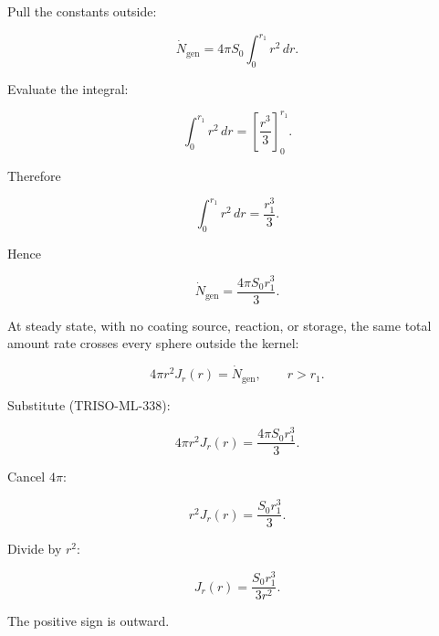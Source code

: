 \documentclass[11pt,a4paper]{article}
\begin{document}
Pull the constants outside:

\begin{equation}
\dot N_{\mathrm{gen}}
=
4\pi S_0
\int_0^{r_1}r^2\,dr.
\tag{TRISO-ML-335}
\label{eq:triso-ml-335}
\end{equation}

Evaluate the integral:

\begin{equation}
\int_0^{r_1}r^2\,dr
=
\left[\frac{r^3}{3}\right]_0^{r_1}.
\tag{TRISO-ML-336}
\label{eq:triso-ml-336}
\end{equation}

Therefore

\begin{equation}
\int_0^{r_1}r^2\,dr
=
\frac{r_1^3}{3}.
\tag{TRISO-ML-337}
\label{eq:triso-ml-337}
\end{equation}

Hence

\begin{equation}
\boxed{
\dot N_{\mathrm{gen}}
=
\frac{4\pi S_0r_1^3}{3}.
}
\tag{TRISO-ML-338}
\label{eq:triso-ml-338}
\end{equation}

At steady state, with no coating source, reaction, or storage, the same total amount rate crosses every sphere outside the kernel:

\begin{equation}
4\pi r^2J_r(r)
=
\dot N_{\mathrm{gen}},
\qquad r>r_1.
\tag{TRISO-ML-339}
\label{eq:triso-ml-339}
\end{equation}

Substitute (TRISO-ML-338):

\begin{equation}
4\pi r^2J_r(r)
=
\frac{4\pi S_0r_1^3}{3}.
\tag{TRISO-ML-340}
\label{eq:triso-ml-340}
\end{equation}

Cancel $4\pi$:

\begin{equation}
r^2J_r(r)=\frac{S_0r_1^3}{3}.
\tag{TRISO-ML-341}
\label{eq:triso-ml-341}
\end{equation}

Divide by $r^2$:

\begin{equation}
\boxed{
J_r(r)=\frac{S_0r_1^3}{3r^2}.
}
\tag{TRISO-ML-342}
\label{eq:triso-ml-342}
\end{equation}

The positive sign is outward.
\end{document}
